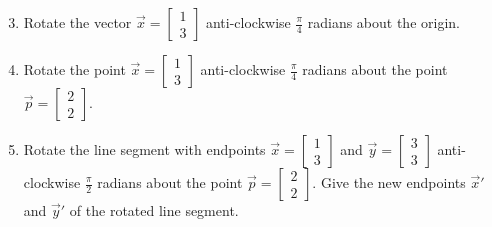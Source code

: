 \documentclass[12pt,a4paper]{article}
\begin{document}
\begin{enumerate}
	\setcounter{enumi}{2}
	\item
	Rotate the vector $\vec{x}=\left[ \begin{array}{c} 1 \\ 3 \end{array}\right]$ anti-clockwise $\frac{\pi}{4}$ radians about the origin.
	\item
	Rotate the point $\vec{x}=\left[ \begin{array}{c} 1 \\ 3 \end{array}\right]$ anti-clockwise $\frac{\pi}{4}$ radians about the point $\vec{p}=\left[ \begin{array}{c} 2 \\ 2 \end{array}\right]$.
	\item
	Rotate the line segment with endpoints $\vec{x}=\left[ \begin{array}{c} 1 \\ 3 \end{array}\right]$ and $\vec{y}=\left[ \begin{array}{c} 3 \\ 3 \end{array}\right]$ anti-clockwise $\frac{\pi}{2}$ radians about the point $\vec{p}=\left[ \begin{array}{c} 2 \\ 2 \end{array}\right]$. Give the new endpoints $\vec{x}'$ and $\vec{y}'$ of the rotated line segment.
\end{enumerate}
\end{document}
